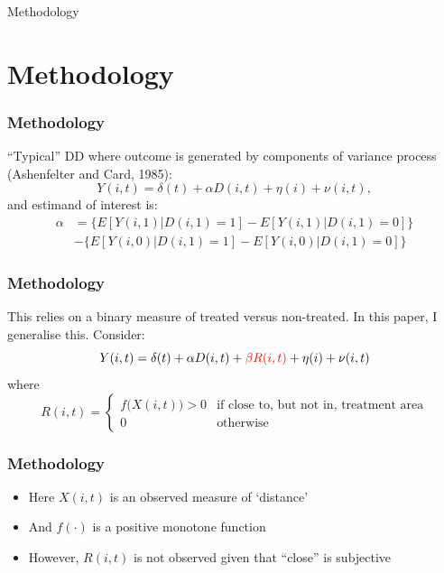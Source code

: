 \documentclass[10pt,letterpaper,subeqn]{beamer}
\begin{document}
\begin{frame}
\begin{center}
\Large Methodology
\end{center}
\end{frame}


\section{Methodology}
\begin{frame}[label=method1]
  \frametitle{Methodology}
``Typical'' DD where outcome is generated by components of variance 
process (Ashenfelter and Card, 1985):
\vspace{4mm}
\begin{equation}
\label{Seqn:COV}
Y(i,t)=\delta(t) + \alpha D(i,t)+\eta(i)+\nu(i,t),
\end{equation}
\vspace{4mm}
and estimand of interest is:
\vspace{4mm}
\begin{eqnarray}
\label{Seqn:DD}
\alpha&=\{E[Y(i,1)|D(i,1)=1]-E[Y(i,1)|D(i,1)=0]\} \\ \nonumber
      &-\{E[Y(i,0)|D(i,1)=1]-E[Y(i,0)|D(i,1)=0]\}
\end{eqnarray}
\end{frame}

\begin{frame}[label=method2]
  \frametitle{Methodology}
This relies on a binary measure of treated versus non-treated.  In this paper,
I generalise this.  Consider:
\vspace{5mm}
\begin{equation}
\label{Seqn:COV2}
Y(i,t)=\delta(t) + \alpha D(i,t)+\textcolor{red}{\beta R(i,t)}+\eta(i)+\nu(i,t)
\end{equation}
\vspace{3mm}
where
\vspace{3mm}
\[
 R(i,t) =
  \begin{cases}
   f\Big(X(i,t)\Big)>0   & \text{if close to, but not in, treatment area} \\ 
   0                            & \text{otherwise} 
  \end{cases}
\]

\end{frame}

\begin{frame}[label=method3]
  \frametitle{Methodology}
\begin{itemize}
\item Here $X(i,t)$ is an observed measure of `distance'
\item And $f(\cdot)$ is a positive monotone function
\item However, $R(i,t)$ is not observed given that ``close'' is subjective
\end{itemize}
\end{frame}
\end{document}
